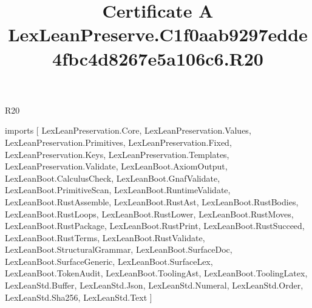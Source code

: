 \begin{lexlean}{R20}
\title{Certificate A LexLeanPreserve.C1f0aab9297edde4fbc4d8267e5a106c6.R20}
\begin{coremodule}
imports [
  LexLeanPreservation.Core,
  LexLeanPreservation.Values,
  LexLeanPreservation.Primitives,
  LexLeanPreservation.Fixed,
  LexLeanPreservation.Keys,
  LexLeanPreservation.Templates,
  LexLeanPreservation.Validate,
  LexLeanBoot.AxiomOutput,
  LexLeanBoot.CalculusCheck,
  LexLeanBoot.GnafValidate,
  LexLeanBoot.PrimitiveScan,
  LexLeanBoot.RuntimeValidate,
  LexLeanBoot.RustAssemble,
  LexLeanBoot.RustAst,
  LexLeanBoot.RustBodies,
  LexLeanBoot.RustLoops,
  LexLeanBoot.RustLower,
  LexLeanBoot.RustMoves,
  LexLeanBoot.RustPackage,
  LexLeanBoot.RustPrint,
  LexLeanBoot.RustSucceed,
  LexLeanBoot.RustTerms,
  LexLeanBoot.RustValidate,
  LexLeanBoot.StructuralGrammar,
  LexLeanBoot.SurfaceDoc,
  LexLeanBoot.SurfaceGeneric,
  LexLeanBoot.SurfaceLex,
  LexLeanBoot.TokenAudit,
  LexLeanBoot.ToolingAst,
  LexLeanBoot.ToolingLatex,
  LexLeanStd.Buffer,
  LexLeanStd.Json,
  LexLeanStd.Numeral,
  LexLeanStd.Order,
  LexLeanStd.Sha256,
  LexLeanStd.Text
]


\end{coremodule}
\end{lexlean}
